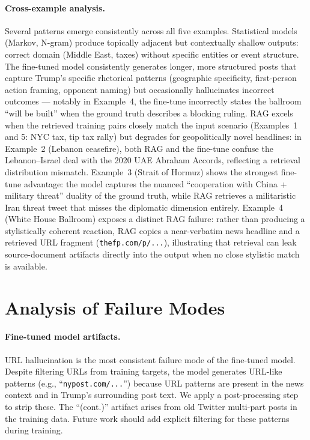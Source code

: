 \documentclass[11pt,a4paper]{article}
\begin{document}
\paragraph{Cross-example analysis.}
Several patterns emerge consistently across all five examples. Statistical models (Markov, N-gram) produce topically adjacent but contextually shallow outputs: correct domain (Middle East, taxes) without specific entities or event structure. The fine-tuned model consistently generates longer, more structured posts that capture Trump's specific rhetorical patterns (geographic specificity, first-person action framing, opponent naming) but occasionally hallucinates incorrect outcomes --- notably in Example~4, the fine-tune incorrectly states the ballroom ``will be built'' when the ground truth describes a blocking ruling. RAG excels when the retrieved training pairs closely match the input scenario (Examples~1 and 5: NYC tax, tip tax rally) but degrades for geopolitically novel headlines: in Example~2 (Lebanon ceasefire), both RAG and the fine-tune confuse the Lebanon--Israel deal with the 2020 UAE Abraham Accords, reflecting a retrieval distribution mismatch. Example~3 (Strait of Hormuz) shows the strongest fine-tune advantage: the model captures the nuanced ``cooperation with China + military threat'' duality of the ground truth, while RAG retrieves a militaristic Iran threat tweet that misses the diplomatic dimension entirely. Example~4 (White House Ballroom) exposes a distinct RAG failure: rather than producing a stylistically coherent reaction, RAG copies a near-verbatim news headline and a retrieved URL fragment (\texttt{thefp.com/p/...}), illustrating that retrieval can leak source-document artifacts directly into the output when no close stylistic match is available.

\section{Analysis of Failure Modes}
\label{sec:failures}

\paragraph{Fine-tuned model artifacts.}
URL hallucination is the most consistent failure mode of the fine-tuned model. Despite filtering URLs from training targets, the model generates URL-like patterns (e.g., ``\texttt{nypost.com/...}'') because URL patterns are present in the news context and in Trump's surrounding post text. We apply a post-processing step to strip these. The ``(cont.)'' artifact arises from old Twitter multi-part posts in the training data. Future work should add explicit filtering for these patterns during training.
\end{document}
